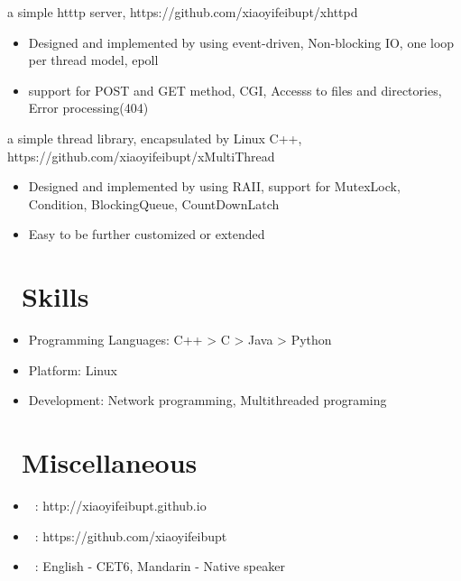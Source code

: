 \documentclass{resume}
\begin{document}
a simple htttp server, https://github.com/xiaoyifeibupt/xhttpd
\begin{itemize}
  \item Designed and implemented by using event-driven, Non-blocking IO, one loop per thread model, epoll
  \item support for POST and GET method, CGI, Accesss to files and directories, Error processing(404)
\end{itemize}

a simple thread library, encapsulated by Linux C++, https://github.com/xiaoyifeibupt/xMultiThread
\begin{itemize}
  \item Designed and implemented by using RAII, support for MutexLock, Condition, BlockingQueue, CountDownLatch
  \item Easy to be further customized or extended
\end{itemize}

\section{\faCogs\ Skills}
\begin{itemize}[parsep=0.5ex]
  \item Programming Languages: C++ > C > Java > Python
  \item Platform: Linux
  \item Development: Network programming, Multithreaded programing
\end{itemize}


\section{\faInfo\ Miscellaneous}
\begin{itemize}[parsep=0.5ex]
  \item \faLink\ : http://xiaoyifeibupt.github.io
  \item \faGithub\ : https://github.com/xiaoyifeibupt
  \item \faLanguage\ : English - CET6, Mandarin - Native speaker
\end{itemize}
\end{document}
